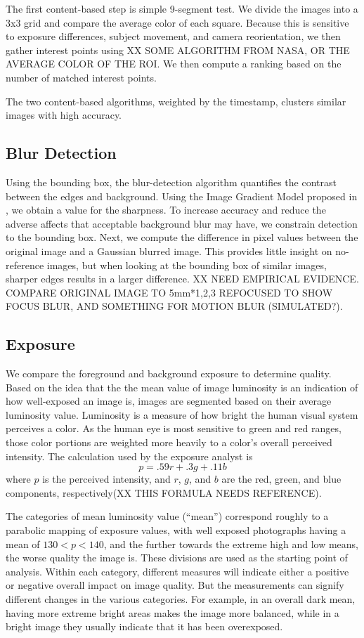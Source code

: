 \documentclass[twocolumn]{article}
\begin{document}
The first content-based step is simple 9-segment test. We divide the images into a 3x3 grid and compare the average color of each square. Because this is sensitive to exposure differences, subject movement, and camera reorientation, we then gather interest points using XX SOME ALGORITHM FROM NASA, OR THE AVERAGE COLOR OF THE ROI. We then compute a ranking based on the number of matched interest points.

The two content-based algorithms, weighted by the timestamp, clusters similar images with high accuracy.

\subsection{Blur Detection}
Using the bounding box, the blur-detection algorithm quantifies the contrast between the edges and background. Using the Image Gradient Model proposed in \cite{springerlink:10.1007/978-3-540-77409-9_26}, we obtain a value for the sharpness. To increase accuracy and reduce the adverse affects that acceptable background blur may have, we constrain detection to the bounding box.
Next, we compute the difference in pixel values between the original image and a Gaussian blurred image. This provides little insight on no-reference images, but when looking at the bounding box of similar images, sharper edges results in a larger difference.
XX NEED EMPIRICAL EVIDENCE. COMPARE ORIGINAL IMAGE TO 5mm*{1,2,3} REFOCUSED TO SHOW FOCUS BLUR, AND SOMETHING FOR MOTION BLUR (SIMULATED?).

\subsection{Exposure}
We compare the foreground and background exposure to determine quality. Based on the idea that the the mean value of image luminosity is an indication of how well-exposed an image is, images are segmented based on their average luminosity value.
Luminosity is a measure of how bright the human visual system perceives a color. As the human eye is most sensitive to green and red ranges, those color portions are weighted more heavily to a color's overall perceived intensity. The calculation used by the exposure analyst is
\[
p=.59r+.3g+.11b
\]
where \(p\) is the perceived intensity, and \(r\), \(g\), and \(b\) are the red, green, and blue components, respectively(XX THIS FORMULA NEEDS REFERENCE).

The categories of mean luminosity value (“mean”) correspond roughly to a parabolic mapping of exposure values, with well exposed photographs having a mean of \(130<p<140\), and the further towards the extreme high and low means, the worse quality the image is. These divisions are used as the starting point of analysis. Within each category, different measures will indicate either a positive or negative overall impact on image quality. But the measurements can signify different changes in the various categories. For example, in an overall dark mean, having more extreme bright areas makes the image more balanced, while in a bright image they usually indicate that it has been overexposed.
\end{document}
